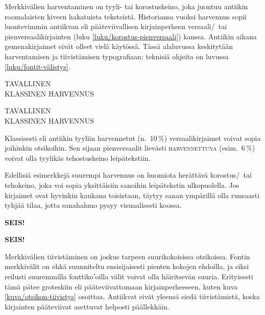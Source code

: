 Merkkivälien harventaminen on tyyli- tai korostuskeino, joka juontuu
antiikin roomalaisten kiveen hakatuista teksteistä. Historiansa vuoksi
harvennus sopii luontevimmin antiikvan eli pääteviivallisen
kirjainperheen versaali\-/\ tai pienversaalikirjainten (luku
\ref{luku/korostus-pienversaali}) kanssa. Antiikin aikana
gemenakirjaimet eivät olleet vielä käytössä. Tässä alaluvussa
keskitytään harventamisen ja tiivistämisen typografiaan; teknisiä
ohjeita on luvussa \ref{luku/fontit-välistys}.

\begin{koodilohkosis}
\large TAVALLINEN \\
{ KLASSINEN HARVENNUS}
\end{koodilohkosis}

\begin{tulossis}
  \large
  TAVALLINEN \\
  { KLASSINEN HARVENNUS}
\end{tulossis}

\noindent
Klassisesti eli antiikin tyyliin harvennetut (n.~10\,\%)
versaalikirjaimet voivat sopia joihinkin otsikoihin. Sen sijaan
pienversaalit lievästi {
  \textsc{harvennettuna}} (esim.~6\,\%) voivat olla tyylikäs
tehostuskeino leipätekstiin.

Edellisiä esimerkkejä suurempi harvennus on huomiota herättävä
korostus\-/\ tai tehokeino, joka voi sopia yksittäisiin sanoihin
leipätekstin ulkopuolella. Jos kirjaimet ovat hyvinkin kaukana
toisistaan, täytyy sanan ympärillä olla runsaasti tyhjää tilaa, jotta
sanahahmo pysyy visuaalisesti koossa.

\begin{koodilohkosis}
{\sffamily\bfseries{} SEIS!}
\end{koodilohkosis}

\begin{tulossis}
  {\sffamily\bfseries{} SEIS!}
\end{tulossis}

\noindent
Merkkivälien tiivistäminen on joskus tarpeen suurikokoisissa otsikoissa.
Fontin merkkivälit on ehkä suunniteltu ensisijaisesti pienten kokojen
ehdoilla, ja siksi reilusti suuremmilla fonttiko'oilla välit voivat olla
häiritsevän suuria. Erityisesti tämä pätee groteskiin eli
pääteviivattomaan kirjainperheeseen, kuten kuva
\ref{kuva/otsikon-tiivistys} osoittaa. Antiikvat eivät yleensä siedä
tiivistämistä, koska kirjainten pääteviivat asettuvat helposti
päällekkäin.

